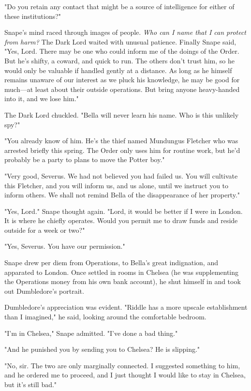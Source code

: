 "Do you retain any contact that might be a source of intelligence for either of these institutions?"

Snape's mind raced through images of people. \emph{Who can I name that I can protect from harm?} The Dark Lord waited with unusual patience. Finally Snape said, "Yes, Lord. There may be one who could inform me of the doings of the Order. But he's shifty, a coward, and quick to run. The others don't trust him, so he would only be valuable if handled gently at a distance. As long as he himself remains unaware of our interest as we pluck his knowledge, he may be good for much—at least about their outside operations. But bring anyone heavy-handed into it, and we lose him."

The Dark Lord chuckled. "Bella will never learn his name. Who is this unlikely spy?"

"You already know of him. He's the thief named Mundungus Fletcher who was arrested briefly this spring. The Order only uses him for routine work, but he'd probably be a party to plans to move the Potter boy."

"Very good, Severus. We had not believed you had failed us. You will cultivate this Fletcher, and you will inform us, and us alone, until we instruct you to inform others. We shall not remind Bella of the disappearance of her property."

"Yes, Lord." Snape thought again. "Lord, it would be better if I were in London. It is where he chiefly operates. Would you permit me to draw funds and reside outside for a week or two?"

"Yes, Severus. You have our permission."

Snape drew per diem from Operations, to Bella's great indignation, and apparated to London. Once settled in rooms in Chelsea (he was supplementing the Operations money from his own bank account), he shut himself in and took out Dumbledore's portrait.

Dumbledore's appreciation was evident. "Riddle has a more upscale establishment than I imagined," he said, looking around the comfortable bedroom.

"I'm in Chelsea," Snape admitted. "I've done a bad thing."

"And he punished you by sending you to Chelsea? He is slipping."

"No, sir. The two are only marginally connected. I suggested something to him, and he ordered me to proceed, and I just thought I would like to stay in Chelsea, but it's still bad."

